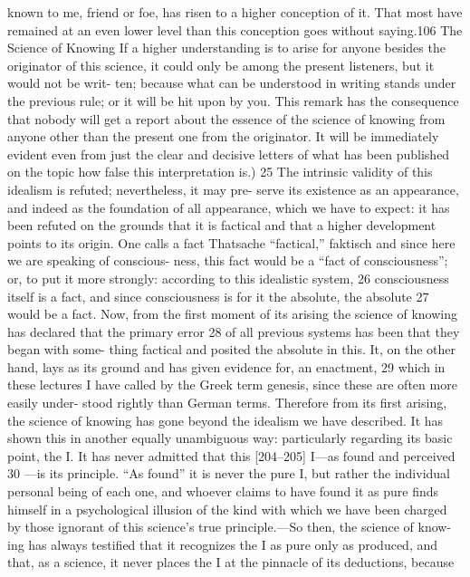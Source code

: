 known to me, friend or foe, has risen to a higher conception of it. That most
have remained at an even lower level than this conception goes without saying.106
The Science of Knowing
If a higher understanding is to arise for anyone besides the originator of this
science, it could only be among the present listeners, but it would not be writ-
ten; because what can be understood in writing stands under the previous rule;
or it will be hit upon by you. This remark has the consequence that nobody will
get a report about the essence of the science of knowing from anyone other
than the present one from the originator. It will be immediately evident even
from just the clear and decisive letters of what has been published on the topic
how false this interpretation is.) 25
The intrinsic validity of this idealism is refuted; nevertheless, it may pre-
serve its existence as an appearance, and indeed as the foundation of all
appearance, which we have to expect: it has been refuted on the grounds that
it is factical and that a higher development points to its origin. One calls a fact
{Thatsache} “factical,” {faktisch} and since here we are speaking of conscious-
ness, this fact would be a “fact of consciousness”; or, to put it more strongly:
according to this idealistic system, 26 consciousness itself is a fact, and since
consciousness is for it the absolute, the absolute 27 would be a fact. Now, from
the first moment of its arising the science of knowing has declared that the
primary error 28 of all previous systems has been that they began with some-
thing factical and posited the absolute in this. It, on the other hand, lays as its
ground and has given evidence for, an enactment, 29 which in these lectures I
have called by the Greek term genesis, since these are often more easily under-
stood rightly than German terms. Therefore from its first arising, the science
of knowing has gone beyond the idealism we have described. It has shown this
in another equally unambiguous way: particularly regarding its basic point, the
I. It has never admitted that this [204–205] I—as found and perceived 30 —is its
principle. “As found” it is never the pure I, but rather the individual personal
being of each one, and whoever claims to have found it as pure finds himself
in a psychological illusion of the kind with which we have been charged by
those ignorant of this science’s true principle.—So then, the science of know-
ing has always testified that it recognizes the I as pure only as produced, and
that, as a science, it never places the I at the pinnacle of its deductions, because
